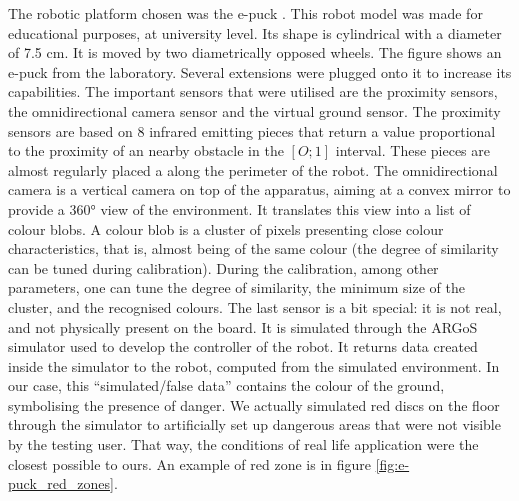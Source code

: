 \documentclass[oneside, a4paper, 12pt]{memoir}
\begin{document}
		The robotic platform chosen was the e-puck \citep{mondada2009puck}. This robot model was made for educational purposes, at university level. Its shape is cylindrical with a diameter of 7.5 cm. It is moved by two diametrically opposed wheels. The figure  shows an e-puck from the laboratory. Several extensions were plugged onto it to increase its capabilities. The important sensors that were utilised are the proximity sensors, the omnidirectional camera sensor and the virtual ground sensor. The proximity sensors are based on 8 infrared emitting pieces that return a value proportional to the proximity of an nearby obstacle in the $[O;1]$ interval. These pieces are almost regularly placed a along the perimeter of the robot. The omnidirectional camera is a vertical camera on top of the apparatus, aiming at a convex mirror to provide a 360° view of the environment. It translates this view into a list of colour blobs. A colour blob is a cluster of pixels presenting close colour characteristics, that is, almost being of the same colour (the degree of similarity can be tuned during calibration). During the calibration, among other parameters, one can tune the degree of similarity, the minimum size of the cluster, and the recognised colours. The last sensor is a bit special: it is not real, and not physically present on the board. It is simulated through the ARGoS simulator used to develop the controller of the robot. It returns data created inside the simulator to the robot, computed from the simulated environment. In our case, this \enquote{simulated/false data} contains the colour of the ground, symbolising the presence of danger. We actually simulated red discs on the floor through the simulator to artificially set up dangerous areas that were not visible by the testing user. That way, the conditions of real life application were the closest possible to ours. An example of red zone is in figure \ref{fig:e-puck_red_zones}.
		
\end{document}
